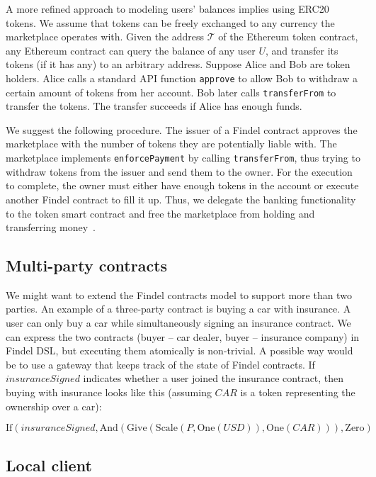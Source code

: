 A more refined approach to modeling users' balances implies using ERC20 tokens.
We assume that tokens can be freely exchanged to any currency the marketplace operates with.
Given the address $\mathcal{T}$ of the Ethereum token contract, any Ethereum contract can query the balance of any user $U$, and transfer its tokens (if it has any) to an arbitrary address.
Suppose Alice and Bob are token holders.
Alice calls a standard API function \texttt{approve} to allow Bob to withdraw a certain amount of tokens from her account.
Bob later calls \texttt{transferFrom} to transfer the tokens.
The transfer succeeds if Alice has enough funds.

We suggest the following procedure.
The issuer of a Findel contract approves the marketplace with the number of tokens they are potentially liable with.
The marketplace implements \texttt{enforcePayment} by calling \texttt{transferFrom}, thus trying to withdraw tokens from the issuer and send them to the owner.
For the execution to complete, the owner must either have enough tokens in the account or execute another Findel contract to fill it up.
Thus, we delegate the banking functionality to the token smart contract and free the marketplace from holding and transferring money~\cite{Khovratovich2016}.


\subsection{Multi-party contracts}

We might want to extend the Findel contracts model to support more than two parties.
An example of a three-party contract is buying a car with insurance.
A user can only buy a car while simultaneously signing an insurance contract.
We can express the two contracts (buyer -- car dealer, buyer -- insurance company) in Findel DSL, but executing them atomically is non-trivial.
A possible way would be to use a gateway that keeps track of the state of Findel contracts.
If \(insuranceSigned\) indicates whether a user joined the insurance contract, then buying with insurance looks like this (assuming \(CAR\) is a token representing the ownership over a car):

\[\mathrm{If}(insuranceSigned,\mathrm{And}(\mathrm{Give}(\mathrm{Scale}(P,\mathrm{One}(USD)),\mathrm{One}(CAR))),\mathrm{Zero})\]


\subsection{Local client}

